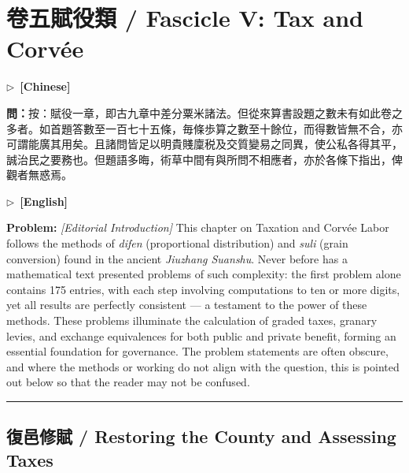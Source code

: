 \documentclass[10pt,a4paper]{article}
\newcommand{\longline}{\par\noindent\rule{\textwidth}{0.4pt}\par}
\newcommand{\CNmarker}{\noindent\textcolor{cnlabel}{$\triangleright$\ \textbf{[Chinese]}}\par}
\newcommand{\ENmarker}{\noindent\textcolor{enlabel}{$\triangleright$\ \textbf{[English]}}\par}
\newcommand{\Question}[1]{\par\noindent\textbf{\color{problemcolor}問：}#1\par}
\newcommand{\QuestionEn}[1]{\par\noindent\textbf{\color{problemcolor}Problem:} #1\par}
\begin{document}
\section*{卷五\quad 賦役類 / Fascicle V: Tax and Corv\'{e}e}

\CNmarker
\Question{按：賦役一章，即古九章中差分粟米諸法。但從來算書設題之數未有如此卷之多者。如首題答數至一百七十五條，毎條歩算之數至十餘位，而得數皆無不合，亦可謂能廣其用矣。且諸問皆足以明貴賤廩税及交質變易之同異，使公私各得其平，誠治民之要務也。但題語多晦，術草中間有與所問不相應者，亦於各條下指出，俾觀者無惑焉。}

\ENmarker
\QuestionEn{\textit{[Editorial Introduction]} This chapter on Taxation and Corv\'{e}e Labor follows the methods of \textit{difen} (proportional distribution) and \textit{suli} (grain conversion) found in the ancient \textit{Jiuzhang Suanshu}. Never before has a mathematical text presented problems of such complexity: the first problem alone contains 175 entries, with each step involving computations to ten or more digits, yet all results are perfectly consistent --- a testament to the power of these methods. These problems illuminate the calculation of graded taxes, granary levies, and exchange equivalences for both public and private benefit, forming an essential foundation for governance. The problem statements are often obscure, and where the methods or working do not align with the question, this is pointed out below so that the reader may not be confused.}

\longline


\newpage
\subsection*{復邑修賦 / Restoring the County and Assessing Taxes}
\end{document}
